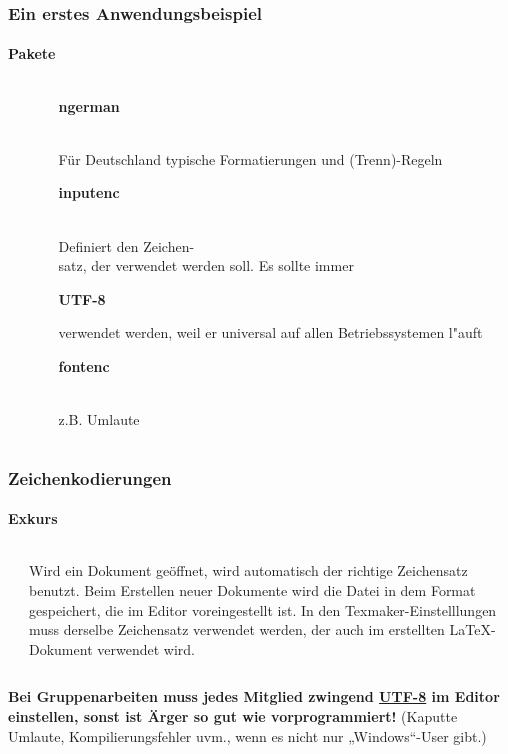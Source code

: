 \begin{frame}
\frametitle{Ein erstes Anwendungsbeispiel}
\framesubtitle{Pakete}
\begin{columns}
\begin{column}{0.55\textwidth}
\begin{ttfamily}\footnotesize

 \normalsize
\end{ttfamily}
\end{column}
\begin{column}{0.45\textwidth}
\begin{ttfamily}\textbf{ngerman}\end{ttfamily}\\
Für Deutschland typische Formatierungen und (Trenn)-Regeln\\[5mm]

\begin{ttfamily}\textbf{inputenc}\end{ttfamily}\\
Definiert den Zeichen-\\satz, der verwendet werden soll. Es sollte immer
\begin{ttfamily}\textbf{UTF-8}\end{ttfamily} verwendet werden, weil er universal auf
allen Betriebssystemen l"auft\\[5mm]

\begin{ttfamily}\textbf{fontenc}\end{ttfamily}\\
z.B. Umlaute\\
\end{column}
\end{columns}
\end{frame}


\begin{frame}
\frametitle{Zeichenkodierungen}
\framesubtitle{Exkurs}
\begin{columns}
\begin{column}{0.6\textwidth}

\end{column}
\begin{column}{0.4\textwidth}
Wird ein Dokument geöffnet, wird automatisch der richtige Zeichensatz benutzt.
Beim Erstellen neuer Dokumente wird die Datei in dem Format gespeichert, die im
 Editor voreingestellt ist. In den Texmaker-Einstelllungen muss derselbe Zeichensatz verwendet werden, der
auch im erstellten LaTeX-Dokument verwendet wird.\\
\end{column}
\end{columns}
\textbf{Bei Gruppenarbeiten muss jedes Mitglied zwingend \underline{UTF-8} im
Editor einstellen, sonst ist Ärger so gut wie vorprogrammiert!} (Kaputte
Umlaute, Kompilierungsfehler uvm., wenn es nicht nur „Windows“-User gibt.)
\end{frame}

